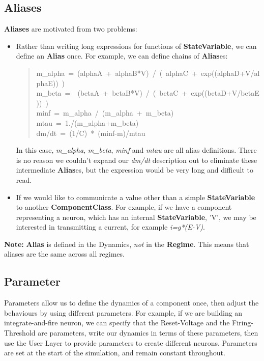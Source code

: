 \documentclass{article}
\newcommand{\note}[1]{%
\begin{center}
\colorbox{issuecolor}{\parbox{0.8\linewidth}{\textbf{Note:} #1}}
\end{center}%
}
\newcommand{\ComponentClass}{{\bf{ComponentClass}}\xspace}
\newcommand{\StateVariable}{{\bf{StateVariable}}\xspace}
\newcommand{\Alias}{{\bf{Alias}}\xspace}
\newcommand{\Aliases}{{\bf{Alias}}es\xspace}
\newcommand{\Regime}{{\bf{Regime}}\xspace}
\begin{document}
\subsection{Aliases}
\label{alias}

\textbf{Aliases} are motivated from two problems:

\begin{itemize}
\item Rather than writing long expressions for functions of \StateVariable,
we can define an \Alias once. For example, we can define chains of
\Aliases:
%
\begin{quote}{\ttfamily \raggedright \noindent
m\_alpha~=~(alphaA~+~alphaB*V)~/~(~alphaC~+~exp((alphaD+V/alphaE))~)\\
m\_beta~=~~(betaA~+~betaB*V)~/~(~betaC~+~exp((betaD+V/betaE))~)\\
minf~=~m\_alpha~/~(m\_alpha~+~m\_beta)\\
mtau~=~1./(m\_alpha+m\_beta)\\
dm/dt~=~(1/C)~*~(minf-m)/mtau
}
\end{quote}

In this case, \emph{m\_alpha}, \emph{m\_beta}, \emph{minf} and \emph{mtau} are all
alias definitions. There is no reason we couldn't expand our \textsl{dm/dt}
description out to eliminate these intermediate \Aliases, but the expression
would be very long and difficult to read.

\item If we would like to communicate a value other than a simple \StateVariable
to another \ComponentClass. For example, if we have a component representing a
neuron, which has an internal \StateVariable, 'V', we may be interested in
transmitting a current, for example \textsl{i=g*(E-V)}.
\end{itemize}

\note{\Alias is defined in the Dynamics, \emph{not} in the
\Regime. This means that aliases are the same across all regimes.}

\subsection{Parameter}
\label{parameters}

Parameters allow us to define the dynamics of a component once, then
adjust the behaviours by using different parameters. For example, if
we are building an integrate-and-fire neuron, we can specify that the
Reset-Voltage and the Firing-Threshold are parameters, write our
dynamics in terms of these parameters, then use the User Layer to
provide parameters to create different neurons. Parameters are set at
the start of the simulation, and remain constant throughout.
\end{document}
